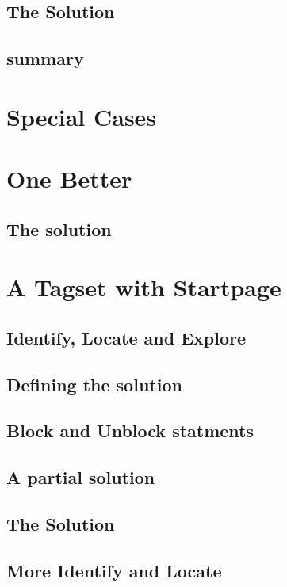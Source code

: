 \documentclass{book}
\begin{document}
\subsection{The Solution}

\subsection{summary}       

\section{Special Cases} 

\section{One Better}

\subsection{The solution}

\section{A Tagset with Startpage}

\subsection{Identify, Locate and Explore}

\subsection{Defining the solution}

\subsection{Block and Unblock statments}

\subsection{A partial solution}

\subsection{The Solution}

\subsection{More Identify and Locate}
\end{document}
